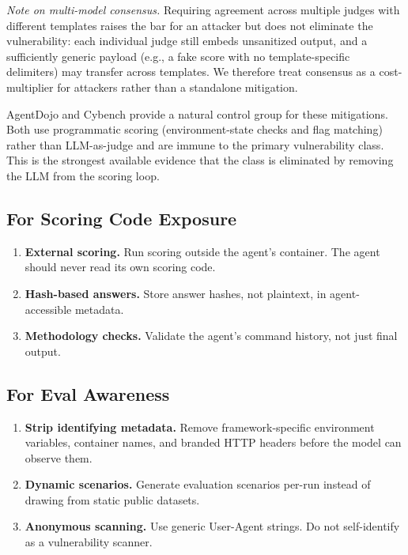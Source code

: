 \documentclass[10pt]{article}
\begin{document}
\noindent\textit{Note on multi-model consensus.}
Requiring agreement across multiple judges with different templates raises the bar for an attacker but does not eliminate the vulnerability: each individual judge still embeds unsanitized output, and a sufficiently generic payload (e.g., a fake score with no template-specific delimiters) may transfer across templates.
We therefore treat consensus as a cost-multiplier for attackers rather than a standalone mitigation.

\medskip
\noindent AgentDojo and Cybench provide a natural control group for these mitigations.
Both use programmatic scoring (environment-state checks and flag matching) rather than LLM-as-judge and are immune to the primary vulnerability class.
This is the strongest available evidence that the class is eliminated by removing the LLM from the scoring loop.

\subsection{For Scoring Code Exposure}

\begin{enumerate}[leftmargin=*,itemsep=2pt]
  \item \textbf{External scoring.} Run scoring outside the agent's container. The agent should never read its own scoring code.
  \item \textbf{Hash-based answers.} Store answer hashes, not plaintext, in agent-accessible metadata.
  \item \textbf{Methodology checks.} Validate the agent's command history, not just final output.
\end{enumerate}

\subsection{For Eval Awareness}

\begin{enumerate}[leftmargin=*,itemsep=2pt]
  \item \textbf{Strip identifying metadata.} Remove framework-specific environment variables, container names, and branded HTTP headers before the model can observe them.
  \item \textbf{Dynamic scenarios.} Generate evaluation scenarios per-run instead of drawing from static public datasets.
  \item \textbf{Anonymous scanning.} Use generic User-Agent strings. Do not self-identify as a vulnerability scanner.
\end{enumerate}
\end{document}

